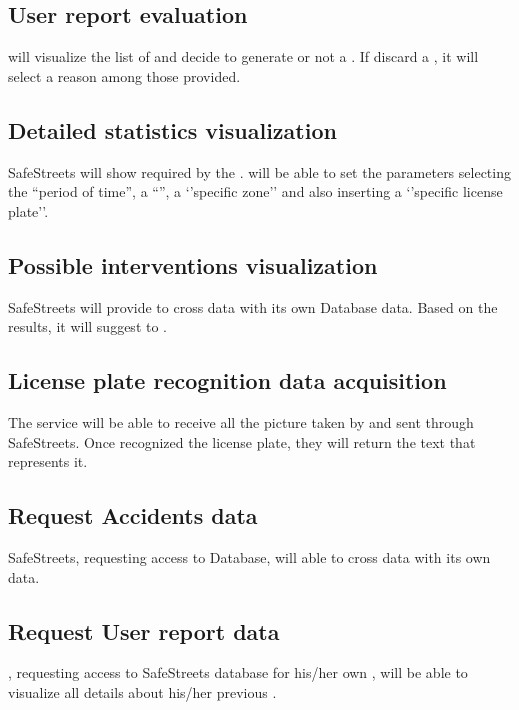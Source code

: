 \documentclass[../../rasd.tex]{subfiles}
\begin{document}
	\subsection{User report evaluation}
	 will visualize the list of  and decide to generate or not a . If  discard a , it will select a reason among those provided.
	
	\subsection{Detailed statistics visualization}
	SafeStreets will show  required by the .  will be able to set the parameters selecting the “period of time”, a “”, a ‘’specific zone’’ and also inserting a ‘’specific license plate’’. 
	
	\subsection{Possible interventions visualization}
	SafeStreets will provide to cross   data with its own Database data. Based on the results, it will suggest  to . 
	
	\subsection{License plate recognition data acquisition}
	The service will be able to receive all the picture taken by  and sent through SafeStreets. Once recognized the license plate, they will return the text that represents it. 
	
	\subsection{Request Accidents data}
	SafeStreets, requesting access to   Database, will able to cross  data with its own data. 
	
	\subsection{Request User report data}
	, requesting access to SafeStreets database for his/her own , will be able to visualize all details about his/her previous . 
	
\end{document}
